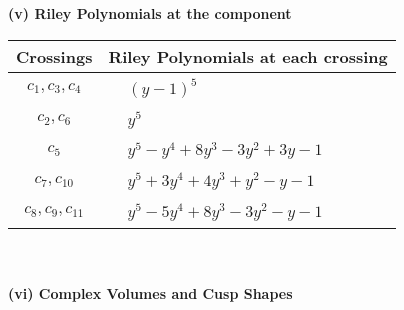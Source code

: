 \documentclass[1p]{elsarticle_modified}
\theoremstyle{definition}
\begin{document}
\newpage\renewcommand{\arraystretch}{1}
\flushleft \textbf{(v) Riley Polynomials at the component}\newline \\
\begin{tabular}{m{50pt}|m{274pt}}
Crossings & \hspace{64pt}Riley Polynomials at each crossing \\
\hline $$\begin{aligned}c_{1},c_{3},c_{4}\end{aligned}$$&$\begin{aligned}
&(y-1)^5
\end{aligned}$\\
\hline $$\begin{aligned}c_{2},c_{6}\end{aligned}$$&$\begin{aligned}
&y^5
\end{aligned}$\\
\hline $$\begin{aligned}c_{5}\end{aligned}$$&$\begin{aligned}
&y^5- y^4+8 y^3-3 y^2+3 y-1
\end{aligned}$\\
\hline $$\begin{aligned}c_{7},c_{10}\end{aligned}$$&$\begin{aligned}
&y^5+3 y^4+4 y^3+y^2- y-1
\end{aligned}$\\
\hline $$\begin{aligned}c_{8},c_{9},c_{11}\end{aligned}$$&$\begin{aligned}
&y^5-5 y^4+8 y^3-3 y^2- y-1
\end{aligned}$\\
\hline
\end{tabular}\\~\\
\newpage\flushleft \textbf{(vi) Complex Volumes and Cusp Shapes}
\end{document}
